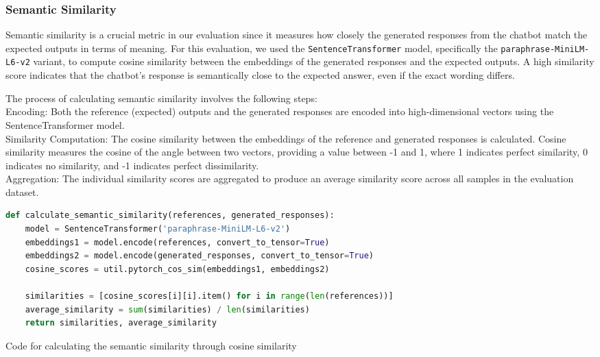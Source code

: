 \subsubsection{Semantic Similarity}

Semantic similarity is a crucial metric in our evaluation since it measures how closely the generated responses from the chatbot match the expected outputs in terms of meaning. For this evaluation, we used the \texttt{SentenceTransformer} model, specifically the \texttt{paraphrase-MiniLM-L6-v2} variant, to compute cosine similarity between the embeddings of the generated responses and the expected outputs. A high similarity score indicates that the chatbot's response is semantically close to the expected answer, even if the exact wording differs.

The process of calculating semantic similarity involves the following steps: \\
Encoding: Both the reference (expected) outputs and the generated responses are encoded into high-dimensional vectors using the SentenceTransformer model.\\
Similarity Computation: The cosine similarity between the embeddings of the reference and generated responses is calculated. Cosine similarity measures the cosine of the angle between two vectors, providing a value between -1 and 1, where 1 indicates perfect similarity, 0 indicates no similarity, and -1 indicates perfect dissimilarity.\\
Aggregation: The individual similarity scores are aggregated to produce an average similarity score across all samples in the evaluation dataset.\\

\begin{Listing}[htb]
    \begin{lstlisting}[language=Python]
def calculate_semantic_similarity(references, generated_responses):
    model = SentenceTransformer('paraphrase-MiniLM-L6-v2')
    embeddings1 = model.encode(references, convert_to_tensor=True)
    embeddings2 = model.encode(generated_responses, convert_to_tensor=True)
    cosine_scores = util.pytorch_cos_sim(embeddings1, embeddings2)

    similarities = [cosine_scores[i][i].item() for i in range(len(references))]
    average_similarity = sum(similarities) / len(similarities)
    return similarities, average_similarity
  \end{lstlisting}
    \caption{Code for calculating the semantic similarity through cosine similarity}
    \label{lst:similarity}
\end{Listing}

